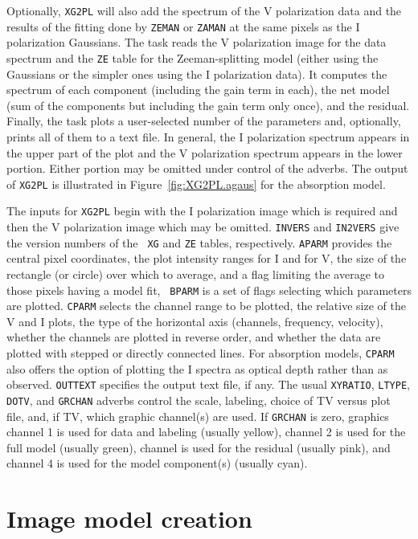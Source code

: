 \documentclass[twoside]{article}
\begin{document}
Optionally, {\tt XG2PL} will also add the spectrum of the V
polarization data and the results of the fitting done by {\tt ZEMAN}
or {\tt ZAMAN} at the same pixels as the I polarization Gaussians.
The task reads the V polarization image for the data spectrum and
the {\tt ZE} table for the Zeeman-splitting model (either using the
Gaussians or the simpler ones using the I polarization data).  It
computes the spectrum of each component (including the gain term in
each), the net model (sum of the components but including the gain
term only once), and the residual.  Finally, the task plots a
user-selected number of the parameters and, optionally, prints all of
them to a text file.  In general, the I polarization spectrum appears
in the upper part of the plot and the V polarization spectrum appears
in the lower portion. Either portion may be omitted under control of
the adverbs.  The output of {\tt XG2PL} is illustrated in
Figure~\ref{fig:XG2PL.agaus} for the absorption model.

The inputs for {\tt XG2PL} begin with the I polarization image which
is required and then the V polarization image which may be omitted.
{\tt INVERS} and {\tt IN2VERS} give the version numbers of the {\tt
  XG} and {\tt ZE} tables, respectively.  {\tt APARM} provides the
central pixel coordinates, the plot intensity ranges for I and for V,
the size of the rectangle (or circle) over which to average, and a
flag limiting the average to those pixels having a model fit,  {\tt
  BPARM} is a set of flags selecting which parameters are plotted.
{\tt CPARM} selects the channel range to be plotted, the relative size
of the V and I plots, the type of the horizontal axis (channels,
frequency, velocity), whether the channels are plotted in reverse
order, and whether the data are plotted with stepped or directly
connected lines.  For absorption models, {\tt CPARM} also offers the
option of plotting the I spectra as optical depth rather than as
observed.  {\tt OUTTEXT} specifies the output text file, if any.  The
usual {\tt XYRATIO}, {\tt LTYPE}, {\tt DOTV}, and {\tt GRCHAN} adverbs
control the scale, labeling, choice of TV versus plot file, and, if
TV, which graphic channel(s) are used.  If {\tt GRCHAN} is zero,
graphics channel 1 is used for data and labeling (usually yellow),
channel 2 is used for the full model (usually green), channel is used
for the residual (usually pink), and channel 4 is used for the model
component(s) (usually cyan).

\section{Image model creation}
\end{document}
